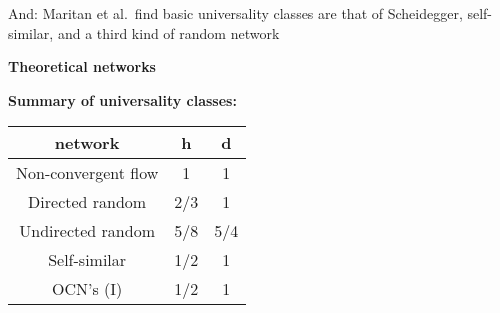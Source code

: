 \begin{frame}[label=]
\begin{frame}[label=]
\begin{frame}[label=]
\begin{frame}[label=]
\begin{frame}[label=]
\begin{frame}[label=]
\begin{frame}[label=]
\begin{frame}[label=]
\begin{frame}[label=]
\begin{frame}[label=]
\begin{frame}[label=]
\begin{frame}[label=]
\begin{frame}[label=]
\begin{frame}[label=]
\begin{frame}[label=]
\begin{frame}[label=]
\begin{frame}[label=]
\begin{frame}[label=]
\begin{frame}[label=]
\begin{frame}[label=]
\begin{frame}[label=]
\begin{frame}[label=]
\begin{frame}[label=]
\begin{frame}[label=]
\begin{frame}[label=]
\begin{frame}[label=]
\begin{frame}[label=]
\begin{frame}[label=]
\begin{frame}[label=]
\begin{frame}[label=]
\begin{frame}[label=]
\begin{frame}[label=]
\begin{frame}[label=]
\begin{frame}[label=]
\begin{frame}[label=]
\begin{frame}[label=]
\begin{frame}[label=]
\begin{frame}[label=]
\begin{frame}[label=]
\begin{frame}[label=]
\begin{frame}[label=]
\begin{frame}[label=]
\begin{frame}[label=]
\begin{frame}[label=]
\begin{frame}[label=]
\begin{frame}[label=]
\begin{frame}[label=]
\begin{frame}[label=]
\begin{frame}[label=]
\begin{frame}[label=]
\begin{frame}[label=]
\begin{frame}[label=]
\begin{frame}[label=]
\begin{frame}[label=]
\begin{frame}[label=]
\begin{frame}[label=]
\begin{frame}[label=]
\begin{frame}[label=]
\begin{frame}[label=]
\begin{frame}[label=]
\begin{frame}[label=]
\begin{frame}[label=]
\begin{frame}[label=]
      \alert{And:}
      Maritan et al.\ find basic universality
      classes are that of Scheidegger, self-similar,
      and a third kind of random network\cite{maritan1996b}
    
  
  

\begin{frame}[label=]
  \textbf{Theoretical networks}

  \textbf{Summary of universality classes:}
    \begin{center}
      \begin{tabular}{ccc}
        \hline\hline
        \textbf{network} & h & d \\
        \hline
        Non-convergent flow      & 1     & 1 \\
        Directed random          & 2/3   & 1 \\
        Undirected random        & 5/8 & 5/4 \\
        Self-similar             & 1/2 & 1 \\
        OCN's (I)                & 1/2 & 1 \\

\end{tabular}
\end{center}
\end{frame}
\end{frame}
\end{frame}
\end{frame}
\end{frame}
\end{frame}
\end{frame}
\end{frame}
\end{frame}
\end{frame}
\end{frame}
\end{frame}
\end{frame}
\end{frame}
\end{frame}
\end{frame}
\end{frame}
\end{frame}
\end{frame}
\end{frame}
\end{frame}
\end{frame}
\end{frame}
\end{frame}
\end{frame}
\end{frame}
\end{frame}
\end{frame}
\end{frame}
\end{frame}
\end{frame}
\end{frame}
\end{frame}
\end{frame}
\end{frame}
\end{frame}
\end{frame}
\end{frame}
\end{frame}
\end{frame}
\end{frame}
\end{frame}
\end{frame}
\end{frame}
\end{frame}
\end{frame}
\end{frame}
\end{frame}
\end{frame}
\end{frame}
\end{frame}
\end{frame}
\end{frame}
\end{frame}
\end{frame}
\end{frame}
\end{frame}
\end{frame}
\end{frame}
\end{frame}
\end{frame}
\end{frame}
\end{frame}
\end{frame}
